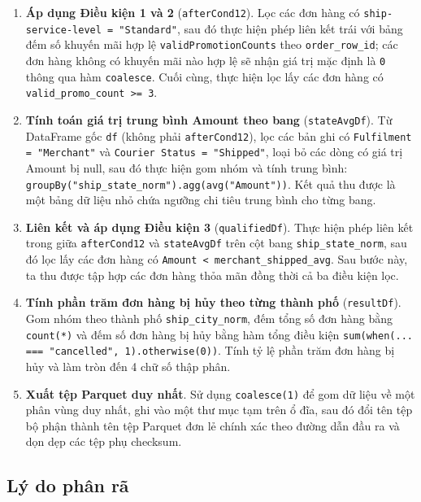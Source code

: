 \begin{enumerate}
    \item \textbf{Áp dụng Điều kiện 1 và 2} (\texttt{afterCond12}).
    Lọc các đơn hàng có \texttt{ship-service-level = "Standard"}, sau đó thực hiện phép liên kết trái với bảng đếm số khuyến mãi hợp lệ \texttt{validPromotionCounts} theo \texttt{order\_row\_id}; các đơn hàng không có khuyến mãi nào hợp lệ sẽ nhận giá trị mặc định là \texttt{0} thông qua hàm \texttt{coalesce}. Cuối cùng, thực hiện lọc lấy các đơn hàng có \texttt{valid\_promo\_count >= 3}.

    \item \textbf{Tính toán giá trị trung bình Amount theo bang} (\texttt{stateAvgDf}).
    Từ DataFrame gốc \texttt{df} (không phải \texttt{afterCond12}), lọc các bản ghi có \texttt{Fulfilment = "Merchant"} và \texttt{Courier Status = "Shipped"}, loại bỏ các dòng có giá trị Amount bị null, sau đó thực hiện gom nhóm và tính trung bình: \texttt{groupBy("ship\_state\_norm").agg(avg("Amount"))}. Kết quả thu được là một bảng dữ liệu nhỏ chứa ngưỡng chi tiêu trung bình cho từng bang.

    \item \textbf{Liên kết và áp dụng Điều kiện 3} (\texttt{qualifiedDf}).
    Thực hiện phép liên kết trong giữa \texttt{afterCond12} và \texttt{stateAvgDf} trên cột bang \texttt{ship\_state\_norm}, sau đó lọc lấy các đơn hàng có \texttt{Amount < merchant\_shipped\_avg}. Sau bước này, ta thu được tập hợp các đơn hàng thỏa mãn đồng thời cả ba điều kiện lọc.

    \item \textbf{Tính phần trăm đơn hàng bị hủy theo từng thành phố} (\texttt{resultDf}).
    Gom nhóm theo thành phố \texttt{ship\_city\_norm}, đếm tổng số đơn hàng bằng \texttt{count(*)} và đếm số đơn hàng bị hủy bằng hàm tổng điều kiện \texttt{sum(when(... === "cancelled", 1).otherwise(0))}. Tính tỷ lệ phần trăm đơn hàng bị hủy và làm tròn đến 4 chữ số thập phân.

    \item \textbf{Xuất tệp Parquet duy nhất}.
    Sử dụng \texttt{coalesce(1)} để gom dữ liệu về một phân vùng duy nhất, ghi vào một thư mục tạm trên ổ đĩa, sau đó đổi tên tệp bộ phận thành tên tệp Parquet đơn lẻ chính xác theo đường dẫn đầu ra và dọn dẹp các tệp phụ checksum.
\end{enumerate}

\subsection{Lý do phân rã}


